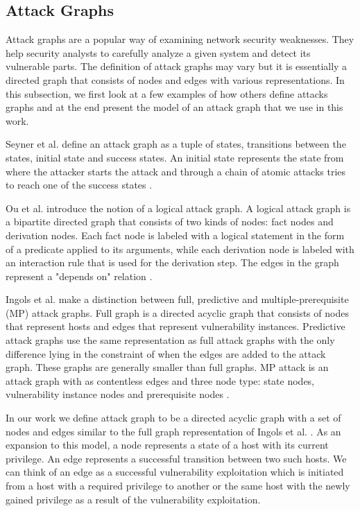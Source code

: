 \subsection{Attack Graphs}
\label{chap:attack_graphs}

Attack graphs are a popular way of examining network security weaknesses. They help security analysts to carefully analyze a given system and detect its vulnerable parts. The definition of attack graphs may vary but it is essentially a directed graph that consists of nodes and edges with various representations. In this subsection, we first look at a few examples of how others define attacks graphs and at the end present the model of an attack graph that we use in this work.

Seyner et al. define an attack graph as a tuple of states, transitions between the states, initial state and success states. An initial state represents the state from where the attacker starts the attack and through a chain of atomic attacks tries to reach one of the success states \cite{sheyner2002automated}.

Ou et al. introduce the notion of a logical attack graph. A logical attack graph is a bipartite directed graph that consists of two kinds of nodes: fact nodes and derivation nodes. Each fact node is labeled with a logical statement in the form of a predicate applied to its arguments, while each derivation node is labeled with an interaction rule that is used for the derivation step. The edges in the graph represent a "depends on" relation \cite{ou2006scalable}.

Ingols et al. make a distinction between full, predictive and multiple-prerequisite (MP) attack graphs. Full graph is a directed acyclic graph that consists of nodes that represent hosts and edges that represent vulnerability instances. Predictive attack graphs use the same representation as full attack graphs with the only difference lying in the constraint of when the edges are added to the attack graph. These graphs are generally smaller than full graphs. MP attack is an attack graph with as contentless edges and three node type: state nodes, vulnerability instance nodes and prerequisite nodes \cite{ingols2006practical}.

In our work we define attack graph to be a directed acyclic graph with a set of nodes and edges similar to the full graph representation of Ingols et al. \cite{ingols2006practical}. As an expansion to this model, a node represents a state of a host with its current privilege. An edge represents a successful transition between two such hosts. We can think of an edge as a successful vulnerability exploitation which is initiated from a host with a required privilege to another or the same host with the newly gained privilege as a result of the vulnerability exploitation.